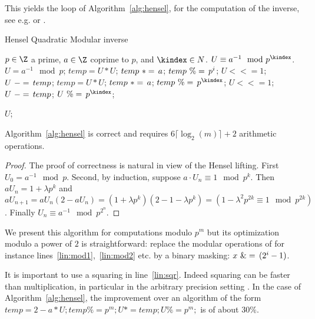 This yields the loop of Algorithm~\ref{alg:hensel}, for the
computation of the inverse, 
see e.g. \cite{Krishnamurthy:1983:padic} or \cite[\S 2.4]{Brent:2011:MCA}.

\begin{algorithm}[htbp]
\caption{Hensel Quadratic Modular inverse}
\label{alg:hensel}
\begin{algorithmic}[1]
\REQUIRE $p\in \Z$ a prime, $a \in \Z$ coprime to $p$,  and $\kindex \in N$.
\ENSURE $U \equiv a^{-1} \mod p^\kindex$.
\STATE $U=a^{-1} \mod p$;\hfill{}
\STATE\label{lin:sqr} $temp = U * U$;\hfill{} 
\STATE $temp ~*=\, a$;\hfill{} 
\STATE\label{lin:mod1} $temp ~\%=\, p^{i}$;\hfill{}
\STATE $U <<= 1$;\hfill{}
\STATE $U ~-=\, temp$;\hfill{}
\ENDFOR 
\STATE $temp = U * U$;\hfill{} 
\STATE $temp ~*=\, a$;\hfill{} 
\STATE\label{lin:mod2} $temp \MODIN p^\kindex$;\hfill{}
\STATE $U <<= 1$;\hfill{}
\STATE $U ~-=\, temp$;\hfill{}
\STATE $U \MODIN p^\kindex$;\hfill{}

\RETURN $U$;
\end{algorithmic}
\end{algorithm}

\begin{lemma}\label{lem:rec} Algorithm~\ref{alg:hensel} is correct and requires 
$6 \lceil \log_2(m) \rceil + 2$ arithmetic operations.
\end{lemma}
\begin{proof} The proof of correctness is natural in view of the Hensel
lifting. First $U_0=a^{-1} \mod p$. Second, by induction, suppose 
$a \cdot U_n \equiv 1 \mod p^{k}$. Then $aU_n=1+\lambda p^k$ and $aU_{n+1} =
aU_n(2-aU_n)=(1+\lambda p^k)(2-1-\lambda p^k)=(1-\lambda^2p^{2k} \equiv 1 \mod
p^{2k})$. Finally $U_n \equiv a^{-1} \mod p^{2^n}$.
\end{proof}

\begin{remark} We present this algorithm for computations modulo $p^m$ but its
optimization modulo a power of $2$ is straightforward: replace the modular
operations of for instance lines~\ref{lin:mod1},~\ref{lin:mod2} etc. by a
binary masking: $x~\&=\, (2^i-1)$. 
\end{remark}

\begin{remark} It is important to use a squaring in line~\ref{lin:sqr}.
Indeed squaring can be faster than multiplication, in particular in the
arbitrary precision setting \cite{Zuras:1994:square}. 
In the case of Algorithm~\ref{alg:hensel}, the improvement over an algorithm of the
form $temp=2-a*U; temp \%= p^m; U*=temp;U\%=p^m;$ is of about $30\%$.
\end{remark}

